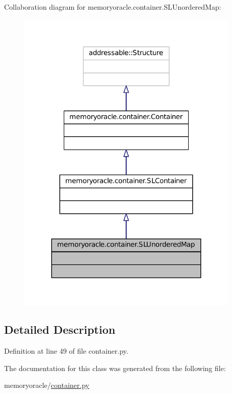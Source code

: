 Collaboration diagram for memoryoracle.\+container.\+S\+L\+Unordered\+Map\+:\nopagebreak
\begin{figure}[H]
\begin{center}
\leavevmode
\includegraphics[width=299pt]{classmemoryoracle_1_1container_1_1SLUnorderedMap__coll__graph}
\end{center}
\end{figure}


\subsection{Detailed Description}


Definition at line 49 of file container.\+py.



The documentation for this class was generated from the following file\+:\begin{DoxyCompactItemize}
\item 
memoryoracle/\hyperlink{container_8py}{container.\+py}\end{DoxyCompactItemize}
